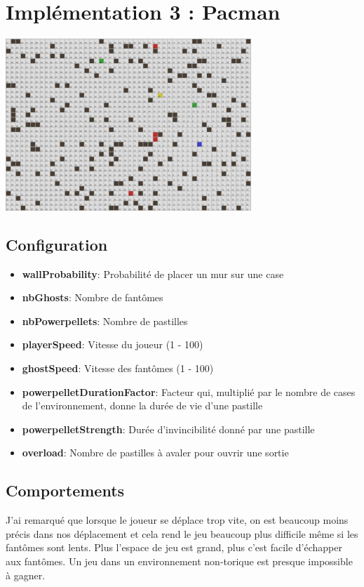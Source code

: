 \documentclass[11pt,a4paper,oneside]{report}
\begin{document}
\newpage

\section*{Implémentation 3 : Pacman}

\begin{center}
\includegraphics[width=350px]{pacman}
\end{center}

\subsection*{Configuration}
\begin{itemize}
\item \textbf{wallProbability}: Probabilité de placer un mur sur une case
\item \textbf{nbGhosts}: Nombre de fantômes
\item \textbf{nbPowerpellets}: Nombre de pastilles
\item \textbf{playerSpeed}: Vitesse du joueur (1 - 100)
\item \textbf{ghostSpeed}: Vitesse des fantômes (1 - 100)
\item \textbf{powerpelletDurationFactor}: Facteur qui, multiplié par le nombre de cases de l'environnement, donne la durée de vie d'une pastille
\item \textbf{powerpelletStrength}: Durée d'invincibilité donné par une pastille
\item \textbf{overload}: Nombre de pastilles à avaler pour ouvrir une sortie
\end{itemize}

\subsection*{Comportements}
J'ai remarqué que lorsque le joueur se déplace trop vite, on est beaucoup moins précis dans nos déplacement et cela rend le jeu beaucoup plus difficile même si les fantômes sont lents. Plus l'espace de jeu est grand, plus c'est facile d'échapper aux fantômes. Un jeu dans un environnement non-torique est presque impossible à gagner.\\
\end{document}
